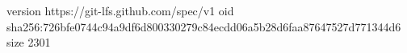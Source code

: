 version https://git-lfs.github.com/spec/v1
oid sha256:726bfe0744c94a9df6d800330279c84ecdd06a5b28d6faa87647527d771344d6
size 2301
